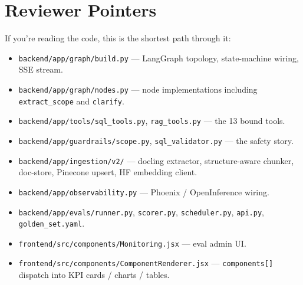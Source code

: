 \documentclass[11pt,a4paper]{article}
\begin{document}
\section{Reviewer Pointers}

If you're reading the code, this is the shortest path through it:

\begin{itemize}
  \item \texttt{backend/app/graph/build.py} --- LangGraph topology, state-machine wiring, SSE stream.
  \item \texttt{backend/app/graph/nodes.py} --- node implementations including \texttt{extract\_scope} and \texttt{clarify}.
  \item \texttt{backend/app/tools/sql\_tools.py}, \texttt{rag\_tools.py} --- the 13 bound tools.
  \item \texttt{backend/app/guardrails/scope.py}, \texttt{sql\_validator.py} --- the safety story.
  \item \texttt{backend/app/ingestion/v2/} --- docling extractor, structure-aware chunker, doc-store, Pinecone upsert, HF embedding client.
  \item \texttt{backend/app/observability.py} --- Phoenix / OpenInference wiring.
  \item \texttt{backend/app/evals/runner.py}, \texttt{scorer.py}, \texttt{scheduler.py}, \texttt{api.py}, \texttt{golden\_set.yaml}.
  \item \texttt{frontend/src/components/Monitoring.jsx} --- eval admin UI.
  \item \texttt{frontend/src/components/ComponentRenderer.jsx} --- \texttt{components[]} dispatch into KPI cards / charts / tables.
\end{itemize}
\end{document}
